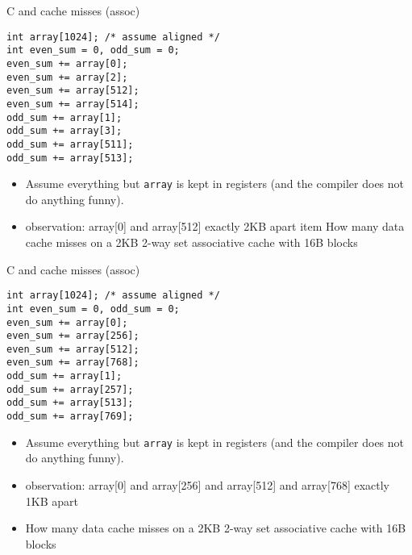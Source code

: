 \begin{frame}[fragile,label=arrayMissesAssocBig1]{C and cache misses (assoc)}
\begin{lstlisting}[style=smaller]
int array[1024]; /* assume aligned */
int even_sum = 0, odd_sum = 0;
even_sum += array[0];
even_sum += array[2];
even_sum += array[512];
even_sum += array[514];
odd_sum += array[1];
odd_sum += array[3];
odd_sum += array[511];
odd_sum += array[513];
\end{lstlisting}
\begin{itemize}
\item {\small
Assume everything but {\tt array} is kept in registers (and the compiler does not do
anything funny).}
\item observation: array[0] and array[512] exactly 2KB apart
item How many data cache misses on a 2KB 2-way set associative cache with 16B blocks
\end{itemize}
\end{frame}

\begin{frame}[fragile,label=arrayMissesAssocBig2]{C and cache misses (assoc)}
\begin{lstlisting}[style=smaller]
int array[1024]; /* assume aligned */
int even_sum = 0, odd_sum = 0;
even_sum += array[0];
even_sum += array[256];
even_sum += array[512];
even_sum += array[768];
odd_sum += array[1];
odd_sum += array[257];
odd_sum += array[513];
odd_sum += array[769];
\end{lstlisting}
\begin{itemize}
\item {\small
Assume everything but {\tt array} is kept in registers (and the compiler does not do
anything funny).}
\item observation: array[0] and array[256] and array[512] and array[768] exactly 1KB apart
\item How many data cache misses on a 2KB 2-way set associative cache with 16B blocks
\end{itemize}
\end{frame}
